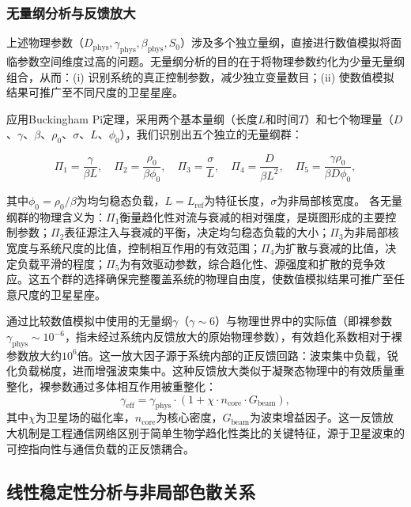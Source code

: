 \documentclass[sn-nature,pdflatex]{sn-jnl}
\begin{document}
\subsubsection{无量纲分析与反馈放大}

上述物理参数（$D_{\text{phys}}, \gamma_{\text{phys}}, \beta_{\text{phys}}, S_0$）涉及多个独立量纲，直接进行数值模拟将面临参数空间维度过高的问题。无量纲分析的目的在于将物理参数约化为少量无量纲组合，从而：(i) 识别系统的真正控制参数，减少独立变量数目；(ii) 使数值模拟结果可推广至不同尺度的卫星星座。

应用Buckingham Pi定理，采用两个基本量纲（长度$L$和时间$T$）和七个物理量（$D$、$\gamma$、$\beta$、$\rho_0$、$\sigma$、$L$、$\phi_0$），我们识别出五个独立的无量纲群：

\begin{equation}
\label{eq:pi_groups}
\Pi_1 = \frac{\gamma}{\beta L},\quad
\Pi_2 = \frac{\rho_0}{\beta \phi_0},\quad
\Pi_3 = \frac{\sigma}{L},\quad
\Pi_4 = \frac{D}{\beta L^2},\quad
\Pi_5 = \frac{\gamma \rho_0}{\beta D \phi_0},
\end{equation}

其中$\phi_0 = \rho_0/\beta$为均匀稳态负载，$L = L_{\text{ref}}$为特征长度，$\sigma$为非局部核宽度。
各无量纲群的物理含义为：$\Pi_1$衡量趋化性对流与衰减的相对强度，是斑图形成的主要控制参数；$\Pi_2$表征源注入与衰减的平衡，决定均匀稳态负载的大小；$\Pi_3$为非局部核宽度与系统尺度的比值，控制相互作用的有效范围；$\Pi_4$为扩散与衰减的比值，决定负载平滑的程度；$\Pi_5$为有效驱动参数，综合趋化性、源强度和扩散的竞争效应。这五个群的选择确保完整覆盖系统的物理自由度，使数值模拟结果可推广至任意尺度的卫星星座。

通过比较数值模拟中使用的无量纲$\gamma$（$\gamma \sim 6$）与物理世界中的实际值（即裸参数$\gamma_{\text{phys}} \sim 10^{-6}$，指未经过系统内反馈放大的原始物理参数），有效趋化系数相对于裸参数放大约$10^6$倍。这一放大因子源于系统内部的正反馈回路：波束集中负载，锐化负载梯度，进而增强波束集中。这种反馈放大类似于凝聚态物理中的有效质量重整化，裸参数通过多体相互作用被重整化：
\begin{equation}
\gamma_{\text{eff}} = \gamma_{\text{phys}} \cdot (1 + \chi \cdot n_{\text{core}} \cdot G_{\text{beam}}),
\end{equation}
其中$\chi$为卫星场的磁化率，$n_{\text{core}}$为核心密度，$G_{\text{beam}}$为波束增益因子。这一反馈放大机制是工程通信网络区别于简单生物学趋化性类比的关键特征，源于卫星波束的可控指向性与通信负载的正反馈耦合。

\subsection{线性稳定性分析与非局部色散关系}
\end{document}
